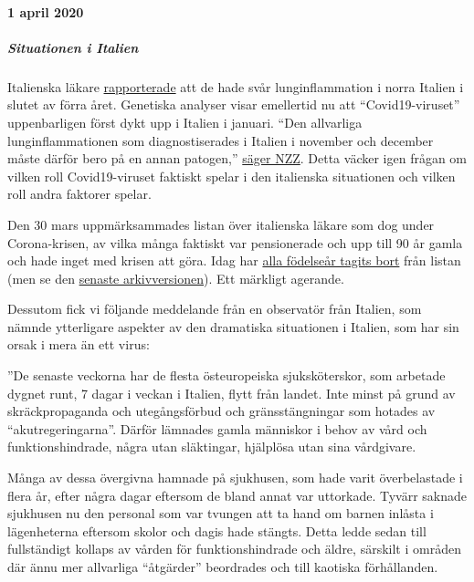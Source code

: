 \hypertarget{1-april-2020}{%
\paragraph{1 april 2020}\label{1-april-2020}}

\hypertarget{situationen-i-italien}{%
\subparagraph{\texorpdfstring{\textbf{Situationen i
Italien}}{Situationen i Italien}}\label{situationen-i-italien}}

Italienska läkare
\href{https://www.scmp.com/news/china/society/article/3076334/coronavirus-strange-pneumonia-seen-lombardy-november-leading}{rapporterade}
att de hade svår lunginflammation i norra Italien i slutet av förra
året. Genetiska analyser visar emellertid nu att ``Covid19-viruset''
uppenbarligen först dykt upp i Italien i januari. ``Den allvarliga
lunginflammationen som diagnostiserades i Italien i november och
december måste därför bero på en annan patogen,''
\href{https://www.nzz.ch/wissenschaft/coronavirus-der-stammbaum-verraet-woher-es-kommt-ld.1548271}{säger
NZZ}. Detta väcker igen frågan om vilken roll Covid19-viruset faktiskt
spelar i den italienska situationen och vilken roll andra faktorer
spelar.

Den 30 mars uppmärksammades listan över italienska läkare som dog under
Corona-krisen, av vilka många faktiskt var pensionerade och upp till 90
år gamla och hade inget med krisen att göra. Idag har
\href{https://portale.fnomceo.it/elenco-dei-medici-caduti-nel-corso-dellepidemia-di-covid-19/}{alla
födelseår tagits bort} från listan (men se den
\href{https://web.archive.org/web/20200328152430/https://portale.fnomceo.it/elenco-dei-medici-caduti-nel-corso-dellepidemia-di-covid-19/}{senaste
arkivversionen}). Ett märkligt agerande.

Dessutom fick vi följande meddelande från en observatör från Italien,
som nämnde ytterligare aspekter av den dramatiska situationen i Italien,
som har sin orsak i mera än ett virus:

''De senaste veckorna har de flesta östeuropeiska sjuksköterskor, som
arbetade dygnet runt, 7 dagar i veckan i Italien, flytt från landet.
Inte minst på grund av skräckpropaganda och utegångsförbud och
gränsstängningar som hotades av ``akutregeringarna''. Därför lämnades
gamla människor i behov av vård och funktionshindrade, några utan
släktingar, hjälplösa utan sina vårdgivare.

Många av dessa övergivna hamnade på sjukhusen, som hade varit
överbelastade i flera år, efter några dagar eftersom de bland annat var
uttorkade. Tyvärr saknade sjukhusen nu den personal som var tvungen att
ta hand om barnen inlåsta i lägenheterna eftersom skolor och dagis hade
stängts. Detta ledde sedan till fullständigt kollaps av vården för
funktionshindrade och äldre, särskilt i områden där ännu mer allvarliga
``åtgärder'' beordrades och till kaotiska förhållanden.

